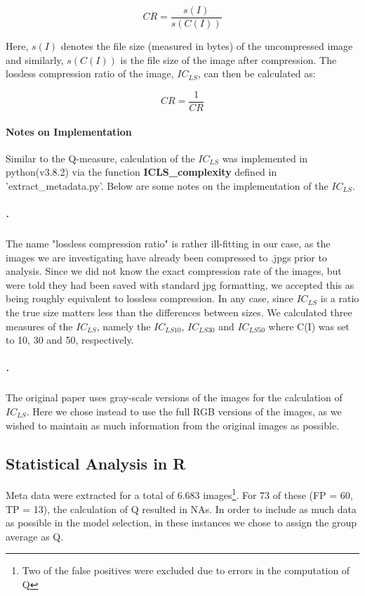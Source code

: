 \documentclass[12pt]{article}
\begin{document}
\begin{equation}
	CR = \frac{s(I)}{s(C(I))}
	\label{eq:CR1}
\end{equation} 

Here, $s(I)$ denotes the file size (measured in bytes) of the uncompressed image and similarly, $s(C(I))$ is the file size of the image after compression. The lossless compression ratio of the image, $IC_{LS}$, can then be calculated as:

\begin{equation}
	CR = \frac{1}{CR}
	\label{eq:CR2}
\end{equation} 

\paragraph{Notes on Implementation}
Similar to the Q-measure, calculation of the $IC_{LS}$ was implemented in python(v3.8.2) via the function \textbf{ICLS\_complexity} defined in 'extract\_metadata.py'. Below are some notes on the implementation of the $IC_{LS}$.
\subparagraph{.}
The name "lossless compression ratio" is rather ill-fitting in our case, as the images we are investigating have already been compressed to .jpgs prior to analysis. Since we did not know the exact compression rate of the images, but were told they had been saved with standard jpg formatting, we accepted this as being roughly equivalent to lossless compression. In any case, since $IC_{LS}$ is a ratio the true size matters less than the differences between sizes. We calculated three measures of the $IC_{LS}$, namely the $IC_{LS10}$, $IC_{LS30}$ and $IC_{LS50}$ where C(I) was set to 10, 30 and 50, respectively.

\subparagraph{.}
The original paper uses gray-scale versions of the images for the calculation of $IC_{LS}$. Here we chose instead to use the full RGB versions of the images, as we wished to maintain as much information from the original images as possible.

\subsection{Statistical Analysis in R}\label{R}
Meta data were extracted for a total of 6.683 images\footnote{Two of the false positives were excluded due to errors in the computation of Q}. For 73 of these (FP = 60, TP = 13), the calculation of Q resulted in NAs. In order to include as much data as possible in the model selection, in these instances we chose to assign the group average as Q.
\end{document}
